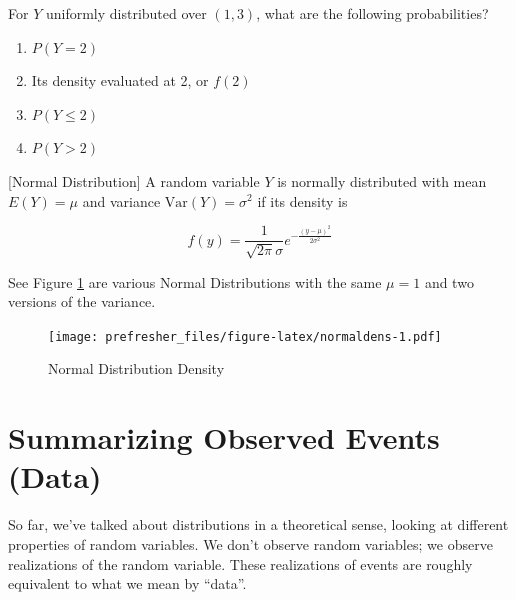 \documentclass[]{book}
\providecommand{\tightlist}{%
  \setlength{\itemsep}{0pt}\setlength{\parskip}{0pt}}
\theoremstyle{definition}
\theoremstyle{definition}
\theoremstyle{definition}
\theoremstyle{remark}
\begin{document}
\protect\hypertarget{exm:unnamed-chunk-92}{}{\label{exm:unnamed-chunk-92} }For \(Y\) uniformly distributed over \((1,3)\), what are the following probabilities?

\begin{enumerate}
\def\labelenumi{\arabic{enumi}.}
\tightlist
\item
  \(P(Y=2)\)
\item
  Its density evaluated at 2, or \(f(2)\)
\item
  \(P(Y \le 2)\)
\item
  \(P(Y > 2)\)
\end{enumerate}

[Normal Distribution]
\protect\hypertarget{def:unnamed-chunk-93}{}{\label{def:unnamed-chunk-93} {} }
A random variable \(Y\) is normally distributed with mean \(E(Y)=\mu\) and variance \(\text{Var}(Y)=\sigma^2\) if its density is

\[f(y)=\frac{1}{\sqrt{2\pi}\sigma}e^{-\frac{(y-\mu)^2}{2\sigma^2}}\]

See Figure \ref{fig:normaldens} are various Normal Distributions with the same \(\mu = 1\) and two versions of the variance.

\begin{figure}
\centering
\texttt{[image: prefresher\_files/figure-latex/normaldens-1.pdf]}
\caption{\label{fig:normaldens}Normal Distribution Density}
\end{figure}

\hypertarget{summarizing-observed-events-data}{%
\section{Summarizing Observed Events (Data)}\label{summarizing-observed-events-data}}

So far, we've talked about distributions in a theoretical sense, looking at different properties of random variables. We don't observe random variables; we observe realizations of the random variable. These realizations of events are roughly equivalent to what we mean by ``data''.
\end{document}
